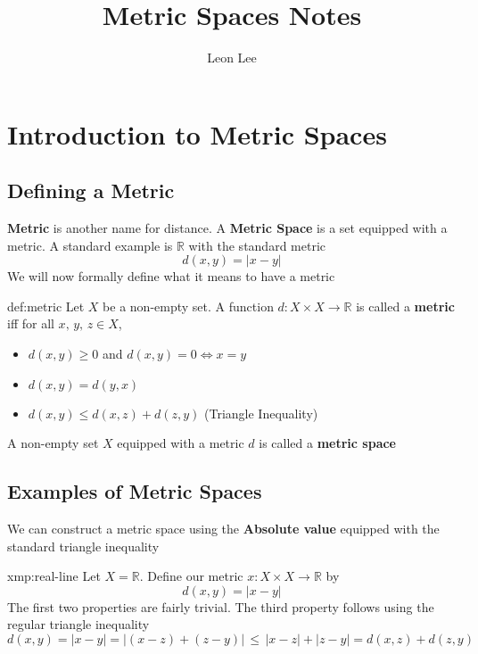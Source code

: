 \documentclass{article}
\title{Metric Spaces Notes}
\author{Leon Lee}
\begin{document}
\maketitle
\newpage
\tableofcontents
\newpage

\section{Introduction to Metric Spaces}
\subsection{Defining a Metric}
\textbf{Metric} is another name for distance. A \textbf{Metric Space} is a set equipped with a metric.
A standard example is $\mathbb{R}$ with the standard metric
\[d(x,y) = \lvert x-y \rvert\]
We will now formally define what it means to have a metric



\begin{thm}{def:metric}{}
    Let $X$ be a non-empty set. A function $d: X \times X \to \mathbb{R} $ is called a \textbf{metric} iff for all $x,\,y,\,z\in X$,
    \begin{itemize}
        \item $d(x,y)\ge 0$ and $d(x,y)=0 \iff x = y$
        \item $d(x,y)=d(y,x)$
        \item $d(x,y)\le d(x,z)+d(z,y)$ (Triangle Inequality)
    \end{itemize}
    A non-empty set $X$ equipped with a metric $d$ is called a \textbf{metric space}
\end{thm}

\subsection{Examples of Metric Spaces}
We can construct a metric space using the \textbf{Absolute value} equipped with the standard triangle inequality
\begin{xmp}{xmp:real-line}{}
    Let $X = \mathbb{R}$. Define our metric $x: X \times X \to \mathbb{R} $ by
    \[d(x,y)=\lvert x-y \rvert\]
    The first two properties are fairly trivial. The third property follows using the regular triangle inequality
    \[d(x,y) = \lvert x - y \rvert = \lvert (x - z) + (z - y) \rvert \,\le\, \lvert x - z \rvert + \lvert z - y \rvert = d(x,z) + d(z,y)\]
\end{xmp}
\end{document}
